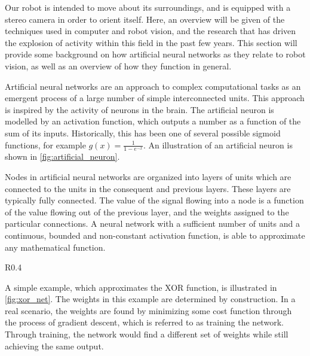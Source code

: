 \documentclass[\rootfolder/main.tex]{subfiles}
\begin{document}
Our robot is intended to move about its surroundings, and is equipped with a stereo camera in order to orient itself.
Here, an overview will be given of the techniques used in computer and robot vision, and the research that has driven the explosion of activity within this field in the past few years.
This section will provide some background on how artificial neural networks as they relate to robot vision, as well as an overview of how they function in general.

Artificial neural networks are an approach to complex computational tasks as an emergent process of a large number of simple interconnected units.
This approach is inspired by the activity of neurons in the brain.
The artificial neuron is modelled by an activation function, which outputs a number as a function of the sum of its inputs.
Historically, this has been one of several possible sigmoid functions, for example $g\left(x\right) = \frac{1}{1 - e^{-x}}$.
An illustration of an artificial neuron is shown in \cref{fig:artificial_neuron}.

Nodes in artificial neural networks are organized into layers of units which are connected to the units in the consequent and previous layers.
These layers are typically fully connected.
The value of the signal flowing into a node is a function of the value flowing out of the previous layer, and the weights assigned to the particular connections.
A neural network with a sufficient number of units and a continuous, bounded and non-constant activation function, is able to approximate any mathematical function\cite{Cybenko1989}\cite{Hornik1991}.

\begin{wrapfigure}{R}{0.4\columnwidth}
    \caption{XOR network, illustrating how neurons can implement basic logic functions.\label{fig:xor_net}}
\end{wrapfigure}

A simple example, which approximates the XOR function, is illustrated in \cref{fig:xor_net}.
The weights in this example are determined by construction.
In a real scenario, the weights are found by minimizing some cost function through the process of gradient descent, which is referred to as training the network\cite{Mitchell1997}.
Through training, the network would find a different set of weights while still achieving the same output.

\end{document}
